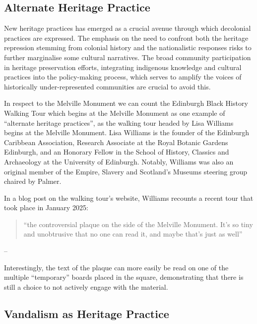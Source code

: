 \documentclass{scrartcl}
\renewcommand{\cite}{\parencite}
\begin{document}
\subsection{Alternate Heritage Practice}

New heritage practices has emerged as a crucial avenue through which decolonial practices are expressed. The emphasis on the need to confront both the heritage repression stemming from colonial history and the nationalistic responses risks to further marginalise some cultural narratives. The broad community participation in heritage preservation efforts, integrating indigenous knowledge and cultural practices into the policy-making process, which serves to amplify the voices of historically under-represented communities are crucial to avoid this. 

In respect to the Melville Monument we can count the Edinburgh Black History Walking Tour which begins at the Melville Monument as one example of ``alternate heritage practices'', as the  walking tour headed by Lisa Williams begins at the Melville Monument. 
Lisa Williams is the founder of the Edinburgh Caribbean Association, Research Associate at the Royal Botanic Gardens Edinburgh, and an Honorary Fellow in the School of History, Classics and Archaeology at the University of Edinburgh. Notably, Williams was also an original member of the Empire, Slavery and Scotland's Museums steering group chaired by Palmer.

In a blog post on the walking tour's website, Williams recounts a recent tour that took place in January 2025:

\begin{quotation}
    ``the controversial plaque on the side of the Melville Monument. It's so tiny and unobtrusive that no one can read it, and maybe that's just as well''
\end{quotation}
\begin{flushright}
    -- \cite{williams_2025}
\end{flushright}

Interestingly, the text of the plaque can more easily be read on one of the multiple ``temporary'' boards placed in the square, demonstrating that there is still a choice to not actively engage with the material.

\subsection{Vandalism as Heritage Practice}
\end{document}

